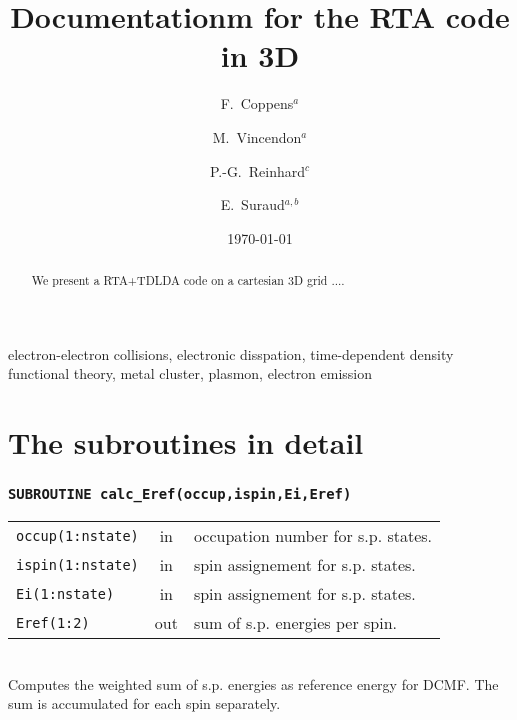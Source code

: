 \documentclass[final,1p]{elsarticle}
\begin{document}
\begin{frontmatter}

\title{Documentationm for the RTA code in 3D}

\author{F.~Coppens$^a$}
\author{M.~Vincendon$^a$}
\author{P.-G.~Reinhard$^c$}
\author{E.~Suraud$^{a,b}$}
\address{$^a$Universit\'e de Toulouse; UPS; Laboratoire de Physique
             Th\'{e}orique, IRSAMC; F-31062 Toulouse Cedex, France}
\address{$^b$Laboratoire de Physique Th\'eorique, Universit\'e Paul
  Sabatier, CNRS, F-31062 Toulouse C\'edex, France}
\address{$^c$Institut f{\"u}r Theoretische Physik, Universit{\"a}t
  Erlangen, D-91058 Erlangen, Germany}

\date{\today}
\begin{abstract}
We present a RTA+TDLDA code on a cartesian 3D grid ....
\end{abstract}

\begin{keyword}
electron-electron collisions, electronic disspation, time-dependent
density functional theory, metal cluster, plasmon, electron emission
\end{keyword}
\end{frontmatter}

\section{The subroutines in detail}

\subsubsection*{\tt SUBROUTINE calc\_Eref(occup,ispin,Ei,Eref)}
\begin{tabular}{lcl}
 {\tt occup(1:nstate)} & in & occupation number for s.p. states.\\
 {\tt ispin(1:nstate)} & in & spin assignement for s.p. states.\\
 {\tt Ei(1:nstate)} & in & spin assignement for s.p. states.\\
 {\tt Eref(1:2)} & out & sum of s.p. energies per spin.\\
\end{tabular}
\\
Computes the weighted sum of s.p. energies as reference energy
for DCMF. The sum is accumulated for each spin separately.
\end{document}
